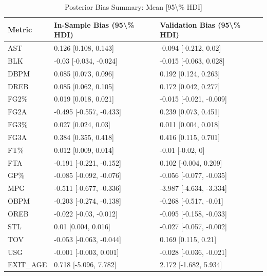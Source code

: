 \begin{table}[t]
\caption*{
{\large Posterior Bias Summary: Mean [95\textbackslash{}\% HDI]}
} 
\fontsize{12.0pt}{14.4pt}\selectfont
\begin{tabular*}{\linewidth}{@{\extracolsep{\fill}}lll}
\toprule
Metric & In-Sample Bias (95\textbackslash{}\% HDI) & Validation Bias (95\textbackslash{}\% HDI) \\ 
\midrule\addlinespace[2.5pt]
AST & 0.126 [0.108, 0.143] & -0.094 [-0.212, 0.02] \\ 
BLK & -0.03 [-0.034, -0.024] & -0.015 [-0.063, 0.028] \\ 
DBPM & 0.085 [0.073, 0.096] & 0.192 [0.124, 0.263] \\ 
DREB & 0.085 [0.062, 0.105] & 0.172 [0.042, 0.277] \\ 
FG2\% & 0.019 [0.018, 0.021] & -0.015 [-0.021, -0.009] \\ 
FG2A & -0.495 [-0.557, -0.433] & 0.239 [0.073, 0.451] \\ 
FG3\% & 0.027 [0.024, 0.03] & 0.011 [0.004, 0.018] \\ 
FG3A & 0.384 [0.355, 0.418] & 0.416 [0.115, 0.701] \\ 
FT\% & 0.012 [0.009, 0.014] & -0.01 [-0.02, 0] \\ 
FTA & -0.191 [-0.221, -0.152] & 0.102 [-0.004, 0.209] \\ 
GP\% & -0.085 [-0.092, -0.076] & -0.056 [-0.077, -0.035] \\ 
MPG & -0.511 [-0.677, -0.336] & -3.987 [-4.634, -3.334] \\ 
OBPM & -0.203 [-0.274, -0.138] & -0.268 [-0.517, -0.01] \\ 
OREB & -0.022 [-0.03, -0.012] & -0.095 [-0.158, -0.033] \\ 
STL & 0.01 [0.004, 0.016] & -0.027 [-0.057, -0.002] \\ 
TOV & -0.053 [-0.063, -0.044] & 0.169 [0.115, 0.21] \\ 
USG & -0.001 [-0.003, 0.001] & -0.028 [-0.036, -0.021] \\ 
EXIT\_AGE & 0.718 [-5.096, 7.782] & 2.172 [-1.682, 5.934] \\ 
\bottomrule
\end{tabular*}
\end{table}

